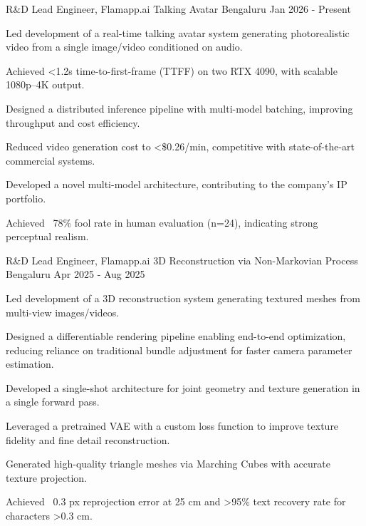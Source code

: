 

\begin{cventries}

  \cventry
    {R\&D Lead Engineer, Flamapp.ai} %
    {Talking Avatar} %
    {Bengaluru} %
    {Jan 2026 - Present} %
    {
      \begin{cvitems}
        \item Led development of a real-time talking avatar system generating photorealistic video from a single image/video conditioned on audio.
  \item Achieved <1.2s time-to-first-frame (TTFF) on two RTX 4090, with scalable 1080p–4K output.
  \item Designed a distributed inference pipeline with multi-model batching, improving throughput and cost efficiency.
  \item Reduced video generation cost to <\$0.26/min, competitive with state-of-the-art commercial systems.
  \item Developed a novel multi-model architecture, contributing to the company's IP portfolio.
  \item Achieved ~78\% fool rate in human evaluation (n=24), indicating strong perceptual realism.
      \end{cvitems}
    }

  \cventry
    {R\&D Lead Engineer, Flamapp.ai} %
    {3D Reconstruction via Non-Markovian Process} %
    {Bengaluru} %
    {Apr 2025 - Aug 2025} %
    {
      \begin{cvitems}
        \item Led development of a 3D reconstruction system generating textured meshes from multi-view images/videos.
        \item Designed a differentiable rendering pipeline enabling end-to-end optimization, reducing reliance on traditional bundle adjustment for faster camera parameter estimation.
        \item Developed a single-shot architecture for joint geometry and texture generation in a single forward pass.
        \item Leveraged a pretrained VAE with a custom loss function to improve texture fidelity and fine detail reconstruction.
        \item Generated high-quality triangle meshes via Marching Cubes with accurate texture projection.
        \item Achieved ~0.3 px reprojection error at 25 cm and >95\% text recovery rate for characters >0.3 cm.
      \end{cvitems}
    }


\end{cventries}
